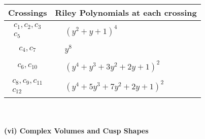 \documentclass[1p]{elsarticle_modified}
\theoremstyle{definition}
\begin{document}
\begin{tabular}{m{50pt}|m{274pt}}
Crossings & \hspace{64pt}Riley Polynomials at each crossing \\
\hline $$\begin{aligned}c_{1},c_{2},c_{3}\\c_{5}\end{aligned}$$&$\begin{aligned}
&(y^2+y+1)^4
\end{aligned}$\\
\hline $$\begin{aligned}c_{4},c_{7}\end{aligned}$$&$\begin{aligned}
&y^8
\end{aligned}$\\
\hline $$\begin{aligned}c_{6},c_{10}\end{aligned}$$&$\begin{aligned}
&(y^4+y^3+3 y^2+2 y+1)^2
\end{aligned}$\\
\hline $$\begin{aligned}c_{8},c_{9},c_{11}\\c_{12}\end{aligned}$$&$\begin{aligned}
&(y^4+5 y^3+7 y^2+2 y+1)^2
\end{aligned}$\\
\hline
\end{tabular}\\~\\
\newpage\flushleft \textbf{(vi) Complex Volumes and Cusp Shapes}
\end{document}
